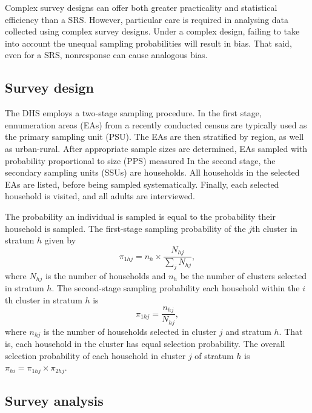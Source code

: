 \documentclass[a4paper, nobind]{templates/ociamthesis}
\begin{document}
Complex survey designs can offer both greater practicality and statistical efficiency than a SRS.
However, particular care is required in analysing data collected using complex survey designs.
Under a complex design, failing to take into account the unequal sampling probabilities will result in bias.
That said, even for a SRS, nonresponse can cause analogous bias.

\hypertarget{survey-design}{%
\subsection{Survey design}\label{survey-design}}

The DHS \autocite{measure2012sampling} employs a two-stage sampling procedure.
In the first stage, ennumeration areas (EAs) from a recently conducted census are typically used as the primary sampling unit (PSU).
The EAs are then stratified by region, as well as urban-rural.
After appropriate sample sizes are determined, EAs sampled with probability proportional to size (PPS) measured
In the second stage, the secondary sampling units (SSUs) are households.
All households in the selected EAs are listed, before being sampled systematically.
Finally, each selected household is visited, and all adults are interviewed.

The probability an individual is sampled is equal to the probability their household is sampled.
The first-stage sampling probability of the \(j\)th cluster in stratum \(h\) given by
\begin{equation}
\pi_{1hj} = n_h \times \frac{N_{hj}}{\sum_j N_{hj}},
\end{equation}
where \(N_{hj}\) is the number of households and \(n_h\) be the number of clusters selected in stratum \(h\).
The second-stage sampling probability each household within the \(i\)th cluster in stratum \(h\) is
\begin{equation}
\pi_{1hj} = \frac{n_{hj}}{N_{hj}},
\end{equation}
where \(n_{hj}\) is the number of households selected in cluster \(j\) and stratum \(h\).
That is, each household in the cluster has equal selection probability.
The overall selection probability of each household in cluster \(j\) of stratum \(h\) is \(\pi_{hi} = \pi_{1hj} \times \pi_{2hj}\).

\hypertarget{survey-analysis}{%
\subsection{Survey analysis}\label{survey-analysis}}
\end{document}
